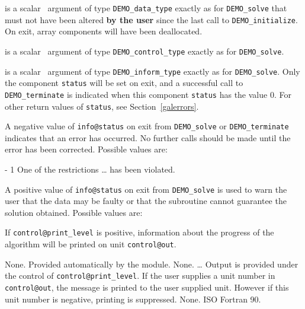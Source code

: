 \documentclass{galahad}
\newcommand{\packagename}{DEMO}
\begin{document}
\vspace*{-3mm}
\begin{description}

 is a scalar \intentinout\ argument of type 
{\tt \packagename\_data\_type} 
exactly as for
{\tt \packagename\_solve}
that must not have been altered {\bf by the user} since the last call to 
{\tt \packagename\_initialize}.
On exit, array components will have been deallocated.

 is a scalar \intentin\ argument of type 
{\tt \packagename\_control\_type}
exactly as for
{\tt \packagename\_solve}.

 is a scalar \intentout\ argument of type 
{\tt \packagename\_inform\_type}
exactly as for
{\tt \packagename\_solve}.
Only the component {\tt status} will be set on exit, and a 
successful call to 
{\tt \packagename\_terminate}
is indicated when this  component {\tt status} has the value 0. 
For other return values of {\tt status}, see Section~\ref{galerrors}.

\end{description}


\galerrors
A negative value of {\tt info@status} on exit from 
{\tt \packagename\_solve}
or 
{\tt \packagename\_terminate}
indicates that an error has occurred. No further calls should be made
until the error has been corrected. Possible values are:

\begin{description}
\item{- 1 } One of the restrictions \ldots
          has been violated.
\end{description}
A positive value of {\tt info@status} on exit from 
{\tt \packagename\_solve}
is used to warn the user that the data may be faulty or that 
the subroutine cannot guarantee the solution obtained.
Possible values are:



\galinfo
If {\tt control@print\_level} is positive, information about the progress 
of the algorithm will be printed on unit {\tt control@out}.


\galgeneral

\galcommon None.
\galworkspace Provided automatically by the module.
\galroutines None. 
\galmodules \ldots
\galio Output is provided under the control of {\tt control@print\_level}.
     If the user supplies a unit number in {\tt control@out}, the message
     is printed to the user supplied unit. However if this unit
     number is negative, printing is suppressed.
\galrestrictions None.
\galportability ISO Fortran 90.
\end{document}
